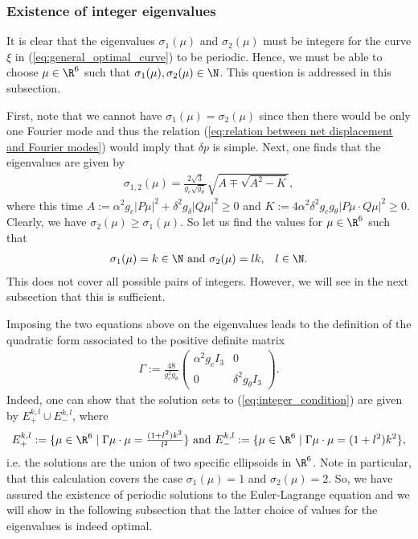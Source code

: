 \subsubsection{Existence of integer eigenvalues}
It is clear that the eigenvalues $\sigma_1(\mu)$ and $\sigma_2(\mu)$ must be integers for the curve $\xi$ in (\ref{eq:general_optimal_curve}) to be periodic. Hence, we must be able to choose $\mu \in \R^6$ such that $\sigma_1(\mu), \sigma_2(\mu) \in \N$. This question is addressed in this subsection.

First, note that we cannot have $\sigma_1(\mu) = \sigma_2(\mu)$ since then there would be only one Fourier mode and thus the relation (\ref{eq:relation between net displacement and Fourier modes}) would imply that $\delta p$ is simple. Next, one finds that the eigenvalues are given by
\begin{align}
	\sigma_{1,2}(\mu) = \frac{2 \sqrt{3}}{g_c \sqrt{g_\theta}} \sqrt{A \mp \sqrt{A^2 - K}},
\end{align}
where this time $A := \alpha^2 g_c |P \mu|^2 + \delta^2 g_{\delta} |Q \mu|^2 \geq 0$ and $K := 4 \alpha^2 \delta^2 g_c g_\theta |P\mu \cdot Q \mu|^2 \geq 0$. Clearly, we have $\sigma_2(\mu) \geq \sigma_1(\mu)$. So let us find the values for $\mu \in \R^6$ such that
\begin{eqnarray}
\label{eq:integer_condition}
	\sigma_1(\mu) = k \in \N \text{ and } \sigma_2(\mu) = lk, & & l \in \N.
\end{eqnarray}
This does not cover all possible pairs of integers. However, we will see in the next subsection that this is sufficient.

Imposing the two equations above on the eigenvalues leads to the definition of the quadratic form associated to the positive definite matrix
\begin{align}
	\Gamma := \frac{48}{g_c^2 g_\theta} \left (\begin{array}{cc}
	\alpha^2 g_c I_3 & 0 \\ 
	0 & \delta^2 g_\theta I_3
	\end{array}  \right ).
\end{align}
Indeed, one can show that the solution sets to (\ref{eq:integer_condition}) are given by $E_+^{k,l} \cup E_{-}^{k,l}$, where
\begin{align}
E_+^{k,l} := \{\mu \in \R^6 \mid \Gamma \mu \cdot \mu = \tfrac{(1 + l^2)k^2}{l^2}\} \text{ and } E_{-}^{k,l} := \{\mu \in \R^6 \mid \Gamma \mu \cdot \mu = (1 + l^2)k^2\},
\end{align}
i.e. the solutions are the union of two specific ellipsoids in $\R^6$. Note in particular, that this calculation covers the case $\sigma_1(\mu) = 1$ and $\sigma_2(\mu) = 2$. So, we have assured the existence of periodic solutions to the Euler-Lagrange equation and we will show in the following subsection that the latter choice of values for the eigenvalues is indeed optimal.

